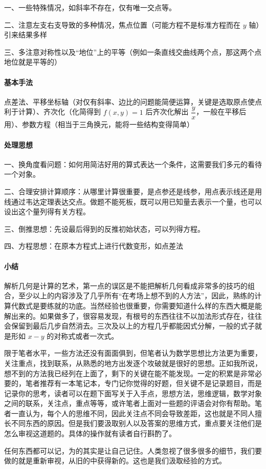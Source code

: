 \documentclass[a4paper,10pt,twoside]{article}
\begin{document}
一、一些特殊情况，如斜率不存在，仅有唯一交点等。

二、注意左支右支导致的多种情况，焦点位置（可能方程不是标准方程而在 $ y  $ 轴）引来结果多样

三、多注意对称性以及“地位”上的平等（例如一条直线交曲线两个点，那这两个点地位就是平等的）

\paragraph{基本手法}
点差法、平移坐标轴（对仅有斜率、边比的问题能简便运算，关键是选取原点使点利于计算）、齐次化（化简得到 $ f(x,y)=1 $ 后齐次化解出 $ \dfrac{y}{x } $，一般在平移后用）、参数方程（相当于三角换元，能将一些结构变得简单）

\paragraph{处理思想}

一、换角度看问题：如何用简洁好用的算式表达一个条件，这需要我们多元的看待一个对象。

二、合理安排计算顺序：从哪里计算很重要，是点参还是线参，用点表示线还是用线通过韦达定理表达交点。做题不能死板，既可以用已知量去表示一个量，也可以设出这个量列得有关方程。

三、倒推思想：先设最后得到的反推初始状态，可以列得方程。

四、方程思想：在原本方程式上进行代数变形，如点差法

\paragraph{小结}
解析几何是计算的艺术，第一点的误区是不能把解析几何看成非常多的技巧的组合，至少以上的内容涉及了几乎所有“在考场上想不到的人方法”，因此，熟练的计算代数式是要练就的功底。当然经验也很重要，你需要知道什么样的东西大概是能解出来的。如果做多了，很容易发现，有根号的东西往往不以加法形式存在，往往会保留到最后几步自然消去。三次及以上的方程几乎都能因式分解，一般的式子就是形如 $ x-y $ 的对称式或者一次式。

限于笔者水平，一些方法还没有面面俱到，但笔者认为数学思想比方法更为重要，关注重点，找到联系，从熟悉的地方出发逐个攻破就是很好的思想。正如我所说，想不到的方法我已经列在上面了，剩下的关键在能不能发现。一定的积累是非常必要的，笔者推荐有一本笔记本，专门记你觉得的好题，但关键不是记录题目，而是记录你的思考，读者可以在题下面写关于入手点，思想方法，思维逻辑，数学对象之间的联系，关注点，重点等等，或许笔者上面对一些题的评语会对你有帮助。笔者一直认为，每个人的思维不同，因此关注点不同会导致差距，这也就是不同人擅长不同东西的原因。但是我们要汲取别人以及答案的思维方式，重点要关注他们是怎么审视这道题的。具体的操作就有读者自行斟酌了。

任何东西都可以记，为的其实是让自己记住。人类忽视了很多很多的细节，我们要做的就是重新审视，从旧的中获得新的。这也是我们汲取经验的方式。
\end{document}
